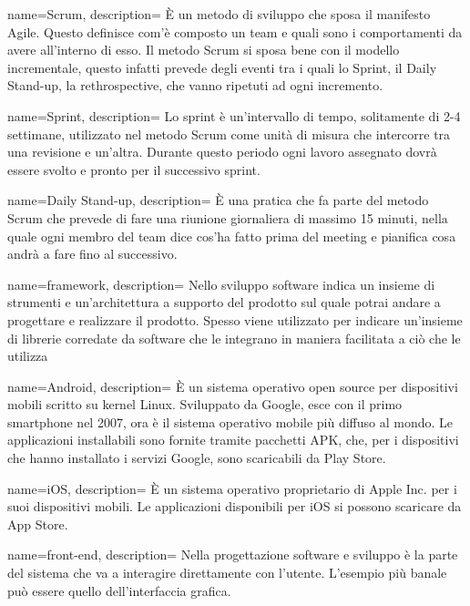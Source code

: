 {
  name=Scrum,
  description={ È un metodo di sviluppo che sposa il manifesto \gls{Agile}. Questo definisce com'è composto un team e quali sono i
  comportamenti da avere all'interno di esso. Il metodo Scrum si sposa bene con il modello incrementale, questo infatti prevede degli eventi
  tra i quali lo \gls{Sprint}, il Daily Stand-up, la rethrospective, che vanno ripetuti ad ogni incremento.  }
}

{
  name=Sprint,
  description={ Lo sprint è un'intervallo di tempo, solitamente di 2-4 settimane, utilizzato nel metodo \gls{Scrum} come unità di misura che
  intercorre tra una revisione e un'altra. Durante questo periodo ogni lavoro assegnato dovrà essere svolto e pronto per il successivo sprint. }
}

{
  name=Daily Stand-up,
  description={ È una pratica che fa parte del metodo Scrum che prevede di fare una riunione giornaliera di massimo 15 minuti, nella quale
  ogni membro del team dice cos'ha fatto prima del meeting e pianifica cosa andrà a fare fino al successivo. }
}

{
  name=framework,
  description={ Nello sviluppo software indica un insieme di strumenti e un'architettura a supporto del prodotto sul quale potrai andare a
  progettare e realizzare il prodotto. Spesso viene utilizzato per indicare un'insieme di librerie corredate da software che le integrano in
  maniera facilitata a ciò che le utilizza }
}

{
  name=Android,
  description={ È un sistema operativo \gls{open source} per dispositivi mobili scritto su kernel Linux. Sviluppato da Google, esce con il primo
  smartphone nel 2007, ora è il sistema operativo mobile più diffuso al mondo. Le applicazioni installabili sono fornite tramite pacchetti
  APK, che, per i dispositivi che hanno installato i servizi Google, sono scaricabili da Play Store.}
}

{
  name=iOS,
  description={ È un sistema operativo proprietario di Apple Inc. per i suoi dispositivi mobili. Le applicazioni disponibili per iOS si
  possono scaricare da App Store.}
}

{
  name=front-end,
  description={ Nella progettazione software e sviluppo è la parte del sistema che va a interagire direttamente con l'utente. L'esempio più
  banale può essere quello dell'interfaccia grafica. }
}

